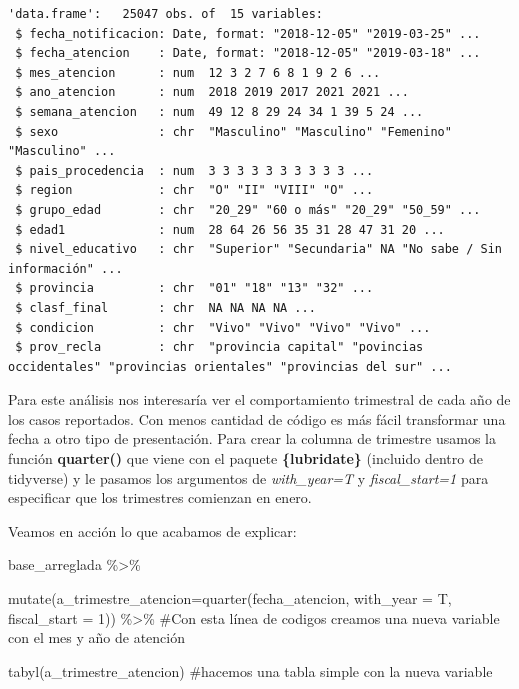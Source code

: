 \documentclass[
  letterpaper,
  DIV=11,
  numbers=noendperiod]{scrreprt}
\newenvironment{Shaded}{\begin{snugshade}}{\end{snugshade}}
\newcommand{\AttributeTok}[1]{\textcolor[rgb]{0.40,0.45,0.13}{#1}}
\newcommand{\CommentTok}[1]{\textcolor[rgb]{0.37,0.37,0.37}{#1}}
\newcommand{\DecValTok}[1]{\textcolor[rgb]{0.68,0.00,0.00}{#1}}
\newcommand{\FunctionTok}[1]{\textcolor[rgb]{0.28,0.35,0.67}{#1}}
\newcommand{\NormalTok}[1]{\textcolor[rgb]{0.00,0.23,0.31}{#1}}
\newcommand{\SpecialCharTok}[1]{\textcolor[rgb]{0.37,0.37,0.37}{#1}}
\begin{document}
\begin{verbatim}
'data.frame':   25047 obs. of  15 variables:
 $ fecha_notificacion: Date, format: "2018-12-05" "2019-03-25" ...
 $ fecha_atencion    : Date, format: "2018-12-05" "2019-03-18" ...
 $ mes_atencion      : num  12 3 2 7 6 8 1 9 2 6 ...
 $ ano_atencion      : num  2018 2019 2017 2021 2021 ...
 $ semana_atencion   : num  49 12 8 29 24 34 1 39 5 24 ...
 $ sexo              : chr  "Masculino" "Masculino" "Femenino" "Masculino" ...
 $ pais_procedencia  : num  3 3 3 3 3 3 3 3 3 3 ...
 $ region            : chr  "O" "II" "VIII" "O" ...
 $ grupo_edad        : chr  "20_29" "60 o más" "20_29" "50_59" ...
 $ edad1             : num  28 64 26 56 35 31 28 47 31 20 ...
 $ nivel_educativo   : chr  "Superior" "Secundaria" NA "No sabe / Sin información" ...
 $ provincia         : chr  "01" "18" "13" "32" ...
 $ clasf_final       : chr  NA NA NA NA ...
 $ condicion         : chr  "Vivo" "Vivo" "Vivo" "Vivo" ...
 $ prov_recla        : chr  "provincia capital" "povincias occidentales" "provincias orientales" "provincias del sur" ...
\end{verbatim}

Para este análisis nos interesaría ver el comportamiento trimestral de
cada año de los casos reportados. Con menos cantidad de código es más
fácil transformar una fecha a otro tipo de presentación. Para crear la
columna de trimestre usamos la función \textbf{quarter()} que viene con
el paquete \textbf{\{lubridate\}} (incluido dentro de tidyverse) y le
pasamos los argumentos de \emph{with\_year=T} y \emph{fiscal\_start=1}
para especificar que los trimestres comienzan en enero.

Veamos en acción lo que acabamos de explicar:

\begin{Shaded}
\begin{Highlighting}[]
\NormalTok{base\_arreglada }\SpecialCharTok{\%\textgreater{}\%} 
  
  \FunctionTok{mutate}\NormalTok{(}\AttributeTok{a\_trimestre\_atencion=}\FunctionTok{quarter}\NormalTok{(fecha\_atencion, }\AttributeTok{with\_year =}\NormalTok{ T, }\AttributeTok{fiscal\_start =} \DecValTok{1}\NormalTok{)) }\SpecialCharTok{\%\textgreater{}\%} \CommentTok{\#Con esta línea de codigos creamos una nueva variable con el mes y año de atención }
  
  \FunctionTok{tabyl}\NormalTok{(a\_trimestre\_atencion) }\CommentTok{\#hacemos una tabla simple con la nueva variable}
\end{Highlighting}
\end{Shaded}
\end{document}
